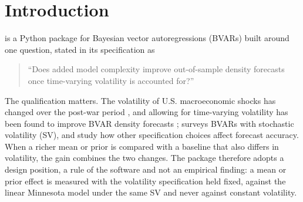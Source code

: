 \section{Introduction}\label{sec:intro}

 is a Python package for Bayesian vector autoregressions (BVARs) built around one question, stated in its specification as
\begin{quote}
``Does added model complexity improve out-of-sample density forecasts once time-varying volatility is accounted for?''
\end{quote}
The qualification matters.
The volatility of U.S. macroeconomic shocks has changed over the post-war period \citep{cogley2005drifts,primiceri2005time,sims2006were}, and allowing for time-varying volatility has been found to improve BVAR density forecasts \citep{clark2011realtime,clark2015macroeconomic,carriero2016common}; \citet{chan2024bvars} surveys BVARs with stochastic volatility (SV), and \citet{carriero2015bayesian} study how other specification choices affect forecast accuracy.
When a richer mean or prior is compared with a baseline that also differs in volatility, the gain combines the two changes.
The package therefore adopts a design position, a rule of the software and not an empirical finding: a mean or prior effect is measured with the volatility specification held fixed, against the linear Minnesota model under the same SV and never against constant volatility. %

